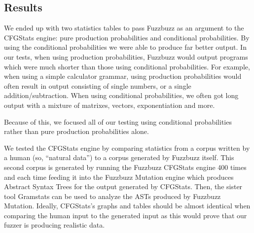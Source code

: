 \subsection{Results}

We ended up with two statistics tables to pass Fuzzbuzz as an argument to the
CFGStats engine: pure production probabilities and conditional probabilities.
By using the conditional probabilities we were able to produce far better
output. In our tests, when using production probabilities, Fuzzbuzz would
output programs which were much shorter than those using conditional
probabilities. For example, when using a simple calculator grammar,
using production probabilities would often result in output consisting of
single numbers, or a single addition/subtraction. When using conditional
probabilities, we often got long output with a mixture of matrixes, vectors,
exponentiation and more.

Because of this, we focused all of our testing using conditional probabilities
rather than pure production probabilities alone.

We tested the CFGStats engine by comparing statistics from a corpus written by
a human (so, ``natural data'') to a corpus generated by Fuzzbuzz itself. This
second corpus is generated by running the Fuzzbuzz CFGStats engine 400 times and
each time feeding it into the Fuzzbuzz Mutation engine which produces Abstract
Syntax Trees for the output generated by CFGStats. Then, the sister tool
Gramstats can be used to analyze the ASTs produced by Fuzzbuzz Mutation.
Ideally, CFGStats's graphs and tables should be almost identical when comparing
the human input to the generated input as this would prove that our fuzzer is
producing realistic data.


